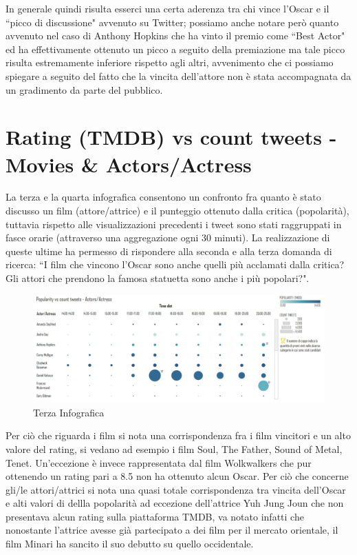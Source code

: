 In generale quindi risulta esserci una certa aderenza tra chi vince l'Oscar e il “picco di discussione" avvenuto su Twitter; possiamo anche notare però quanto avvenuto nel caso di Anthony Hopkins che ha vinto il premio come “Best Actor" ed ha effettivamente ottenuto un picco a seguito della premiazione ma tale picco risulta estremamente inferiore rispetto agli altri, avvenimento che ci possiamo spiegare a seguito del fatto che la vincita dell'attore non è stata accompagnata da un gradimento da parte del pubblico.

\section{Rating (TMDB) vs count tweets - Movies \& Actors/Actress}

La terza e la quarta infografica consentono un confronto fra quanto è stato discusso un film (attore/attrice) e il punteggio ottenuto dalla critica (popolarità), tuttavia rispetto alle visualizzazioni precedenti i tweet sono stati raggruppati in fasce orarie (attraverso una aggregazione ogni 30 minuti).  La realizzazione di queste ultime ha permesso di rispondere alla seconda e alla terza domanda di ricerca: “I film che vincono l'Oscar sono anche quelli più acclamati dalla critica? Gli attori che prendono la famosa statuetta sono anche i più popolari?". 

	\begin{figure}[h]
			\centering
			\includegraphics[width=1\linewidth]{imgs/photo1631116691.jpeg}
			\caption{Terza Infografica}
			\label{fig:Terza infografica}
		\end{figure}

  Per ciò che riguarda i film si nota una corrispondenza fra i film vincitori e un alto valore del rating, si vedano ad esempio i film Soul, The Father, Sound of Metal, Tenet. Un'eccezione è invece rappresentata dal film Wolkwalkers che pur ottenendo un rating pari a 8.5 non ha ottenuto alcun Oscar. Per ciò che concerne gli/le attori/attrici si nota una quasi totale corrispondenza tra vincita dell'Oscar e alti valori di dellla popolarità ad eccezione dell'attrice Yuh Jung Joun che non presentava alcun rating sulla piattaforma TMDB, va notato infatti che nonostante l'attrice avesse già partecipato a dei film per il mercato orientale, il film Minari ha sancito il suo debutto su quello occidentale.

